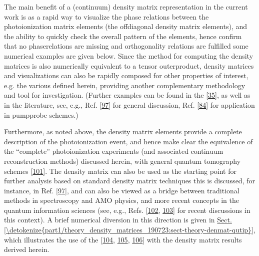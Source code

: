 \documentclass[letterpaper,table,10pt,english]{jupyterBook}
\begin{document}
\sphinxAtStartPar
The main benefit of a (continuum) density matrix representation in the current work is as a rapid way to visualize the phase relations between the photoionization matrix elements (the off\sphinxhyphen{}diagonal density matrix elements), and the ability to quickly check the overall pattern of the elements, hence confirm that no phase\sphinxhyphen{}relations are missing and orthogonality relations are fulfilled \sphinxhyphen{} some numerical examples are given below. Since the method for computing the density matrices is also numerically equivalent to a tensor outer\sphinxhyphen{}product, density matrices and visualizations can also be rapidly composed for other properties of interest, e.g. the various {\hyperref[\detokenize{backmatter/glossary:term-channel-functions}]{}} defined herein, providing another complementary methodology and tool for investigation. (Further examples can be found in the  {[}\hyperlink{cite.backmatter/bibliography:id606}{35}{]}, as well as in the literature, see, e.g., Ref. {[}\hyperlink{cite.backmatter/bibliography:id535}{97}{]} for general discussion, Ref. {[}\hyperlink{cite.backmatter/bibliography:id837}{84}{]} for application in pump\sphinxhyphen{}probe schemes.)

\sphinxAtStartPar
Furthermore, as noted above, the density matrix elements provide a complete description of the photoionization event, and hence make clear the equivalence of the “complete” photoionization experiments (and associated continuum reconstruction methods) discussed herein, with general quantum tomography schemes {[}\hyperlink{cite.backmatter/bibliography:id782}{101}{]}. The density matrix can also be used as the starting point for further analysis based on standard density matrix techniques \sphinxhyphen{} this is discussed, for instance, in Ref. {[}\hyperlink{cite.backmatter/bibliography:id535}{97}{]}, and can also be viewed as a bridge between traditional methods in spectroscopy and AMO physics, and more recent concepts in the quantum information sciences (see, e.g., Refs. {[}\hyperlink{cite.backmatter/bibliography:id922}{102}, \hyperlink{cite.backmatter/bibliography:id986}{103}{]} for recent discussions in this context). A brief numerical diversion in this direction is given in \hyperref[\detokenize{part1/theory_density_matrices_190723:sect-theory-denmat-qutip}]{Sect.\@ \ref{\detokenize{part1/theory_density_matrices_190723:sect-theory-denmat-qutip}}}, which illustrates the use of the  {[}\hyperlink{cite.backmatter/bibliography:id706}{104}, \hyperlink{cite.backmatter/bibliography:id707}{105}, \hyperlink{cite.backmatter/bibliography:id833}{106}{]} with the density matrix results derived herein.
\end{document}
